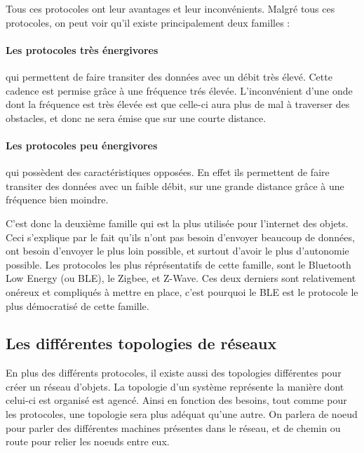 Tous ces protocoles ont leur avantages et leur inconvénients. Malgré tous ces protocoles, on peut voir qu'il 
existe principalement deux familles :

\paragraph{Les protocoles très énergivores}qui permettent de faire transiter des données avec un débit très 
élevé. Cette cadence est permise grâce à une fréquence trés élevée. L'inconvénient d'une onde dont la 
fréquence est très élevée est que celle-ci aura plus de mal à traverser des obstacles, et donc ne sera émise 
que sur une courte distance.

\paragraph{Les protocoles peu énergivores}qui possèdent des caractéristiques opposées. En effet ils 
permettent de faire transiter des données avec un faible débit, sur une grande distance grâce à une fréquence 
bien moindre.

C'est donc la deuxième famille qui est la plus utilisée pour l'internet des objets. Ceci s'explique par le 
fait qu'ils n'ont pas besoin d'envoyer beaucoup de données, ont besoin d'envoyer le plus loin possible, et 
surtout d'avoir le plus d'autonomie possible. Les protocoles les plus réprésentatifs de cette famille, sont le 
Bluetooth Low Energy (ou BLE), le Zigbee, et Z-Wave. Ces deux derniers sont relativement onéreux et compliqués 
à mettre en place, c'est pourquoi le BLE est le protocole le plus démocratisé de cette famille.

	\subsection{Les différentes topologies de réseaux}
En plus des différents protocoles, il existe aussi des topologies différentes pour créer un réseau d'objets. 
La topologie d'un système représente la manière dont celui-ci est organisé est agencé. Ainsi en fonction des 
besoins, tout comme pour les protocoles, une topologie sera plus adéquat qu'une autre. On parlera de noeud 
pour parler des différentes machines présentes dans le réseau, et de chemin ou route pour relier les noeuds 
entre eux.

